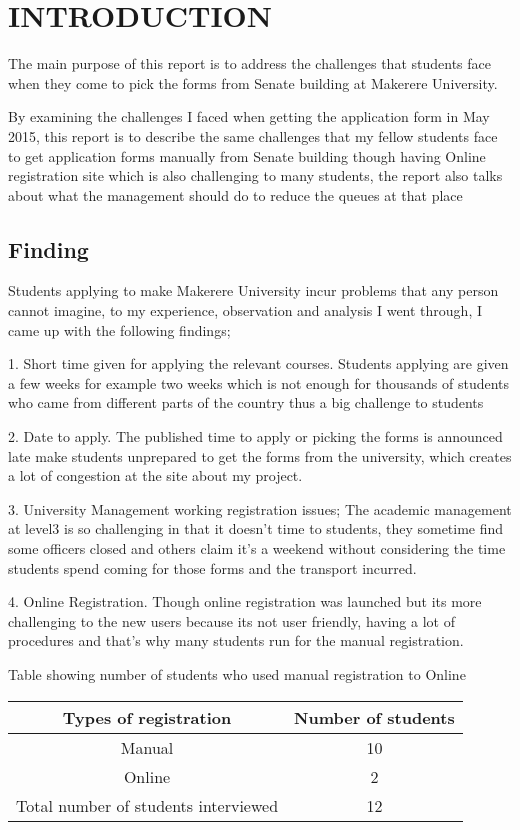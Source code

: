 \documentclass[14pt]{article}
\begin{document}
 
 

\section{INTRODUCTION}
The main purpose of this report is to address the challenges that students face when they come to pick the forms from Senate building at Makerere University.\par
   By examining the challenges I faced when getting the application form in May 2015, this report is to describe the same challenges that my fellow students face to get application forms manually from Senate building though having Online registration site which is also challenging to many students, the report also talks about what the management should do to reduce the queues at that place
\subsection{Finding}
Students applying to make Makerere University incur problems that any person cannot imagine, to my experience, observation and analysis I went through, I came up with the following findings;\par
1.	Short time given for applying the relevant courses. Students applying are given a few weeks for example two weeks which is not enough for thousands of students who came from different parts of the country thus a big challenge to students\par
2.	Date to apply. The published time to apply or picking the forms is announced late make students unprepared to get the forms from the university, which creates a lot of congestion at the site about my project.\par
3.	University Management working registration issues; The academic management at level3 is so challenging in that it doesn’t time to students, they sometime find some officers closed and others claim it’s a weekend without considering the time students spend coming for those forms and the transport incurred.\par
4.	Online Registration. Though online registration was launched but its more challenging to the new users because its not user friendly, having a lot of procedures and that’s why many students run for the manual registration.\par
Table showing number of students who used manual registration to Online

\begin{table}[h]
\centering
\begin{tabular}{c c}
\hline
Types of registration&	Number of students\\[0.5ex]
\hline
Manual & 10\\
\hline
Online &  2\\
\hline
Total number of students interviewed&	12\\
\hline
\end{tabular}
\end{table}
\end{document}
